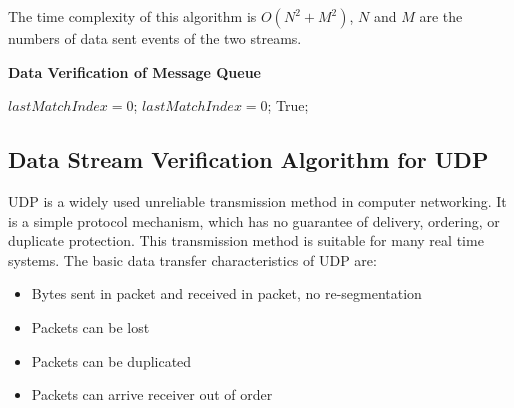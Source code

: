 The time complexity of this algorithm is $O(N^2+M^2)$, $N$ and $M$ are the numbers of data sent events of the two streams.

\begin{algorithm}[H]
\DontPrintSemicolon
\caption{{\bf Data Verification of Message Queue } \label{dataAlg3}}
\;
$lastMatchIndex = 0$;\;
$lastMatchIndex = 0$;\;
 \KwRet True;\;
\end{algorithm} 

\subsection{Data Stream Verification Algorithm for UDP}
UDP is a widely used unreliable transmission method in computer networking. It is a simple protocol mechanism, which has no guarantee of delivery, ordering, or duplicate protection. This transmission method is suitable for many real time systems. The basic data transfer characteristics of UDP are:
\begin{itemize}
  \item Bytes sent in packet and received in packet, no re-segmentation
  \item Packets can be lost
  \item Packets can be duplicated
  \item Packets can arrive receiver out of order
\end{itemize}

